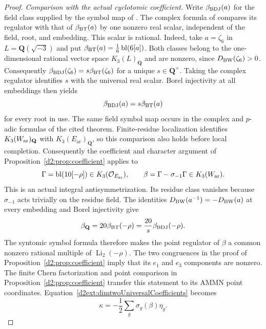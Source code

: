 \documentclass[11pt,a4paper]{amsart}
\numberwithin{equation}{section}
\theoremstyle{definition}
\theoremstyle{remark}
\begin{document}
\begin{proof}
\emph{Comparison with the actual cyclotomic coefficient.}
Write $\beta_{\rm BDJ}(a)$ for the field class supplied by the
symbol map of \cite[Theorem~1.10(1)--(2) and Remark~1.7]{BesserDeJeu}.
The complex formula of \cite[Proposition~4.1 and Remark~5.2]{DeJeuWedge}
compares its regulator with that of $\beta_{\rm BT}(a)$ by one
nonzero real scalar, independent of the field, root, and embedding.
This scalar is rational. Indeed, take $a=\zeta_6$ in
$L=\mathbf Q(\sqrt{-3})$ and put
$\beta_{\rm BT}(a)=\frac16\operatorname{bl}(6[a])$.
Both classes belong to the one-dimensional rational vector space
$K_3(L)_{\mathbf Q}$ \cite[Proposition~12.2]{Borel}
and are nonzero, since $D_{\rm BW}(\zeta_6)>0$. Consequently
$\beta_{\rm BDJ}(\zeta_6)=s\beta_{\rm BT}(\zeta_6)$ for a
unique $s\in\mathbf Q^\times$. Taking the complex regulator
identifies $s$ with the universal real scalar. Borel injectivity
at all embeddings \cite[Section~6]{BunkeTamme} then yields
\[
 \beta_{\rm BDJ}(a)=s\beta_{\rm BT}(a)
\]
for every root in use. The same field symbol map occurs in the
complex and $p$-adic formulas of the cited theorem.
Finite-residue localization identifies
$K_3(W_{\rm ar})_{\mathbf Q}$ with $K_3(E_{\mathrm{ar}})_{\mathbf Q}$,
so this comparison also holds before local completion.
Consequently the coefficient and character argument of
Proposition~\ref{d2:prop:coefficient} applies to
\[
 \Gamma=\operatorname{bl}(10[-\rho])\in K_3(\mathcal O_{E_{\mathrm{ar}}}),
 \qquad \beta=\Gamma-\sigma_{-1}\Gamma\in K_3(W_{\rm ar}).
\]
This is an actual integral antisymmetrization. Its residue class
vanishes because $\sigma_{-1}$ acts trivially on the residue field.
The identities $D_{\rm BW}(a^{-1})=-D_{\rm BW}(a)$ at every
embedding and Borel injectivity \cite[Section~6]{BunkeTamme} give
\[
 \beta_{\mathbf Q}=20\beta_{\rm BT}(-\rho)
                  =\frac{20}{s}\beta_{\rm BDJ}(-\rho).
\]
The syntomic symbol formula therefore makes the point regulator
of $\beta$ a common nonzero rational multiple of
$\operatorname{Li}_2(-\rho)$. The two congruences in
the proof of Proposition~\ref{d2:prop:coefficient} imply that its $e_1$ and
$e_3$ components are nonzero. The finite Chern factorization and
point comparison in Proposition~\ref{d2:prop:coefficient}
transfer this statement to its AMMN point coordinates.
Equation~\eqref{d2ext:dimtwoUniversalCoefficients} becomes
\begin{equation}\label{d2ext:dimtwoExactHalf}
 \kappa=-\frac12\sum_g\sigma_g(\beta)\eta_g.
\end{equation}


\end{proof}
\end{document}
